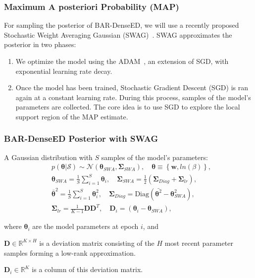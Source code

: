 \documentclass{beamer}
\theoremstyle{remark}
\begin{document}
\begin{frame}
\frametitle{Maximum A posteriori Probability (MAP)}
For sampling the posterior of BAR-DenseED, we will use a recently proposed Stochastic Weight Averaging Gaussian (SWAG)~\cite{maddox2019simple}.
SWAG approximates the posterior in two phases:
\begin{enumerate}
    \item We optimize the model using the ADAM~\cite{kingma2014adam}, an extension of SGD, with exponential learning rate decay.
    \item Once the model has been trained, Stochastic Gradient Descent (SGD) is ran again at a constant learning rate.
    During this process, samples of the model's parameters are collected.
    The core idea is to use SGD to explore the local support region of the MAP estimate.
\end{enumerate}
\end{frame}

\begin{frame}
\frametitle{BAR-DenseED Posterior with SWAG}
A Gaussian distribution with $S$ samples of the model's parameters:
\begin{align}
    &p(\bm{\theta}|\mathcal{S}) \sim \mathcal{N}\left(\bm{\theta}_{SWA}, \bm{\Sigma}_{SWA}\right), \quad \bm{\theta} \equiv \left\{\textbf{w}, ln(\beta)\right\},\\
    &\bm{\theta}_{SWA}=\frac{1}{S}\sum_{i=1}^{S}\bm{\theta}_{i}, \quad \bm{\Sigma}_{SWA}=\frac{1}{2}\left(\bm{\Sigma}_{Diag}+\bm{\Sigma}_{lr}\right),\\
    &\bar{\bm{\theta}}^{2}=\frac{1}{S}\sum_{i=1}^{S}\bm{\theta}^{2}_{i}, \quad \bm{\Sigma}_{Diag} = \textrm{Diag}\left(\bar{\bm{\theta}^{2}}-\bm{\theta}_{SWA}^{2}\right),\\
    &\bm{\Sigma}_{lr}=\frac{1}{K-1}\bm{D}\bm{D}^{T}, \quad \bm{D}_{i} = \left(\bm{\theta}_{i}-\bm{\theta}_{SWA}\right),
\end{align}

where $\bm{\theta}_{i}$ are the model parameters at epoch $i$, and 

$\bm{D} \in \mathbb{R}^{K\times H}$ is a deviation matrix consisting of the $H$ most recent parameter samples forming a low-rank approximation.

$\bm{D}_{i} \in \mathbb{R}^{K}$ is a column of this deviation matrix.
\end{frame}
\end{document}
